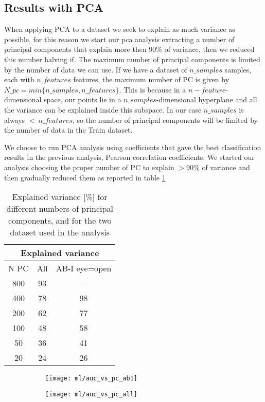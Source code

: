 \documentclass[a4paper,11pt]{article}
\begin{document}
\newpage

\subsection{Results with PCA}

When applying PCA to a dataset we seek to explain as much variance as possible, for this reason we start our pca analysis extracting a number of principal components that explain more then 90$\%$ of variance, then we reduced this number halving if.
The maximum number of principal components is limited by the number of data we can use. If we have a dataset of $n\_samples$ samples, each with $n\_features$ features, the maximum number of PC is given by $N\_pc = min\{n\_samples, n\_features\}$.
This is because in a $n-feature$-dimensional space, our points lie in a $n\_samples$-dimensional hyperplane and all the variance can be explained inside this subspace.
In our case $n\_samples$ is always $< \ n\_features$, so the number of principal components will be limited by the number of data in the Train dataset.

We choose to run PCA analysis using coefficients that gave the best classification results in the previous analysis, Pearson correlation coefficients.
We started our analysis choosing the proper number of PC to explain $> 90\%$ of variance and then gradually reduced them as reported in table \ref{tab:pca_explained}

\begin{table}
\centering
\begin{tabular}{ |c|c c| }
\hline
\multicolumn{3}{|c|}{Explained variance} \\
 \hline
  N PC & All & AB-I eye=open \\
  \hline
 800 & 93 & -- \\
 400 & 78 & 98 \\
 200 & 62 & 77 \\
 100 &48 & 58 \\
 50 & 36 & 41 \\
 20 & 24 & 26\\
 \hline
\end{tabular}
\caption{Explained variance [\%] for different numbers of principal components, and for the two dataset used in the analysis}
\label{tab:pca_explained}
\end{table}





\begin{figure}
\centering
\begin{subfigure}[b]{.45\textwidth}
   \texttt{[image: ml/auc\_vs\_pc\_ab1]}
   \caption{}
   \label{}
\end{subfigure}
\begin{subfigure}[b]{.45\textwidth}
   \texttt{[image: ml/auc\_vs\_pc\_all]}
   \caption{}
   \label{}
\end{subfigure}
\caption{}
\label{}
\end{figure}
\end{document}
